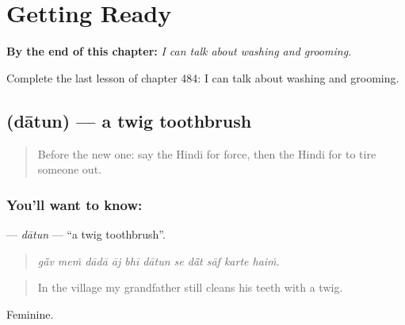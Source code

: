 
\chapter{Getting Ready}
\label{ch:hi-getting-ready}

\begin{chapteropening}
\textbf{By the end of this chapter:} \emph{I can talk about washing and grooming.}

Complete the last lesson of chapter 484: I can talk about washing and grooming.
\end{chapteropening}

\section[\texorpdfstring{\hi{दातुन} (dātun)}{दातुन (dātun)}]{ (dātun) — a twig toothbrush}

\label{lesson:HI-C484-datun}



\begin{quote}
Before the new one: say the Hindi for force, then the Hindi for to tire someone out.
\end{quote}

\subsection*{You'll want to know: }
\textbf{} — \emph{dātun} — \textquotedblleft{}a twig toothbrush\textquotedblright{}.

\begin{quote}
          
\end{quote}

\begin{quote}
\emph{gā̃v meṁ dādā āj bhī dātun se dā̃t sāf karte haiṁ.}
\end{quote}

\begin{quote}
In the village my grandfather still cleans his teeth with a twig.
\end{quote}

Feminine.

